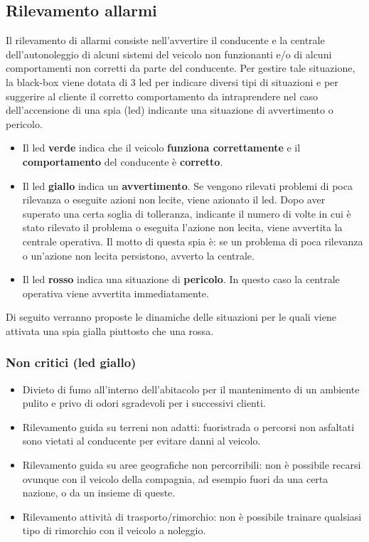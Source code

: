\documentclass[12pt, a4paper, italian]{report}
\numberwithin{figure}{chapter}
\numberwithin{table}{chapter}
\begin{document}
\subsection{Rilevamento allarmi}
Il rilevamento di allarmi consiste nell'avvertire il conducente e la centrale dell'autonoleggio di alcuni sistemi del veicolo non funzionanti e/o di alcuni comportamenti non corretti da parte del conducente. Per gestire tale situazione, la black-box viene dotata di 3 led per indicare diversi tipi di situazioni e per suggerire al cliente il corretto comportamento da intraprendere nel caso dell'accensione di una spia (led) indicante una situazione di avvertimento o pericolo. 
\begin{itemize}
    \item Il led \textbf{verde} indica che il veicolo \textbf{funziona correttamente} e il \textbf{comportamento} del conducente è \textbf{corretto}.
    \item Il led \textbf{giallo} indica un \textbf{avvertimento}. Se vengono rilevati problemi di poca rilevanza o eseguite azioni non lecite, viene azionato il led. Dopo aver superato una certa soglia di tolleranza, indicante il numero di volte in cui è stato rilevato il problema o eseguita l'azione non lecita, viene avvertita la centrale operativa. Il motto di questa spia è: se un problema di poca rilevanza o un'azione non lecita persistono, avverto la centrale.
    \item Il led \textbf{rosso} indica una situazione di \textbf{pericolo}. In questo caso la centrale operativa viene avvertita immediatamente.
\end{itemize}

Di seguito verranno proposte le dinamiche delle situazioni per le quali viene attivata una spia gialla piuttosto che una rossa.

\subsubsection{Non critici (led giallo)}

\begin{itemize}
    \item Divieto di fumo all'interno dell'abitacolo per il mantenimento di un ambiente pulito e privo di odori sgradevoli per i successivi clienti.
    \item Rilevamento guida su terreni non adatti: fuoristrada o percorsi non asfaltati sono vietati al conducente per evitare danni al veicolo. 
    \item Rilevamento guida su aree geografiche non percorribili: non è possibile recarsi ovunque con il veicolo della compagnia, ad esempio fuori da una certa nazione, o da un insieme di queste.
    \item Rilevamento attività di trasporto/rimorchio: non è possibile trainare qualsiasi tipo di rimorchio con il veicolo a noleggio.
\end{itemize}
\end{document}
